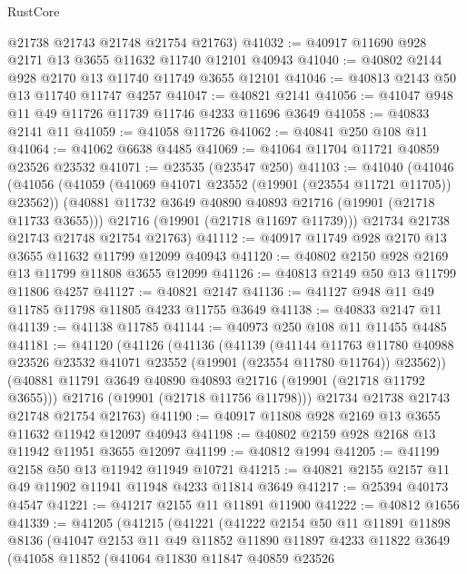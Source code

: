 \begin{lexlean}{RustCore}
\begin{coremodule}
      @21738
      @21743
      @21748
      @21754
      @21763)
@41032 := @40917 @11690 @928 @2171 @13 @3655 @11632 @11740 @12101 @40943
@41040 := @40802 @2144 @928 @2170 @13 @11740 @11749 @3655 @12101
@41046 := @40813 @2143 @50 @13 @11740 @11747 @4257
@41047 := @40821 @2141
@41056 := @41047 @948 @11 @49 @11726 @11739 @11746 @4233 @11696 @3649
@41058 := @40833 @2141 @11
@41059 := @41058 @11726
@41062 := @40841 @250 @108 @11
@41064 := @41062 @6638 @4485
@41069 := @41064 @11704 @11721 @40859 @23526 @23532
@41071 := @23535 (@23547 @250)
@41103 := @41040
    (@41046
      (@41056
        (@41059 (@41069 @41071 @23552 (@19901 (@23554 @11721 @11705)) @23562))
        (@40881 @11732 @3649 @40890 @40893 @21716 (@19901 (@21718 @11733 @3655)))
        @21716
        (@19901 (@21718 @11697 @11739)))
      @21734
      @21738
      @21743
      @21748
      @21754
      @21763)
@41112 := @40917 @11749 @928 @2170 @13 @3655 @11632 @11799 @12099 @40943
@41120 := @40802 @2150 @928 @2169 @13 @11799 @11808 @3655 @12099
@41126 := @40813 @2149 @50 @13 @11799 @11806 @4257
@41127 := @40821 @2147
@41136 := @41127 @948 @11 @49 @11785 @11798 @11805 @4233 @11755 @3649
@41138 := @40833 @2147 @11
@41139 := @41138 @11785
@41144 := @40973 @250 @108 @11 @11455 @4485
@41181 := @41120
    (@41126
      (@41136
        (@41139
          (@41144
            @11763
            @11780
            @40988
            @23526
            @23532
            @41071
            @23552
            (@19901 (@23554 @11780 @11764))
            @23562))
        (@40881 @11791 @3649 @40890 @40893 @21716 (@19901 (@21718 @11792 @3655)))
        @21716
        (@19901 (@21718 @11756 @11798)))
      @21734
      @21738
      @21743
      @21748
      @21754
      @21763)
@41190 := @40917 @11808 @928 @2169 @13 @3655 @11632 @11942 @12097 @40943
@41198 := @40802 @2159 @928 @2168 @13 @11942 @11951 @3655 @12097
@41199 := @40812 @1994
@41205 := @41199 @2158 @50 @13 @11942 @11949 @10721
@41215 := @40821 @2155 @2157 @11 @49 @11902 @11941 @11948 @4233 @11814 @3649
@41217 := @25394 @40173 @4547
@41221 := @41217 @2155 @11 @11891 @11900
@41222 := @40812 @1656
@41339 := @41205
    (@41215
      (@41221
        (@41222
          @2154
          @50
          @11
          @11891
          @11898
          @8136
          (@41047
            @2153
            @11
            @49
            @11852
            @11890
            @11897
            @4233
            @11822
            @3649
            (@41058
              @11852
              (@41064
                @11830
                @11847
                @40859
                @23526

\end{coremodule}
\end{lexlean}
